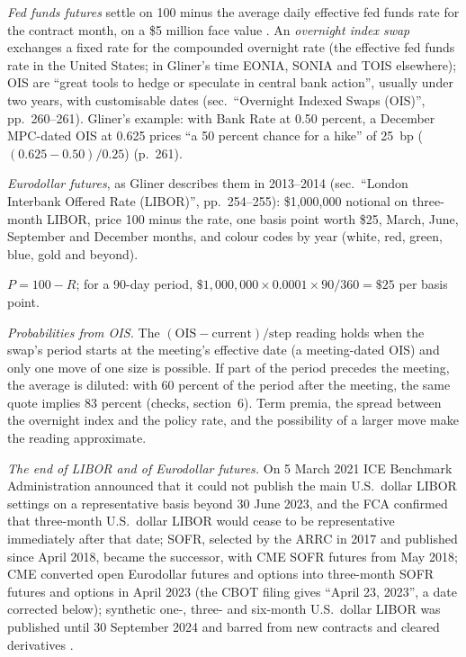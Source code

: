\begin{qfmethod}\label{meth:policy-path-ois-futures}
 \emph{Fed funds futures} settle on 100 minus the average daily effective fed funds rate for the contract month, on a \$5 million face value \citep[chap.~9, sec.\ ``Federal (Fed) Funds'', PDF pp.~257--259, Table~9.1]{s7-gliner}. An \emph{overnight index swap} exchanges a fixed rate for the compounded overnight rate (the effective fed funds rate in the United States; in Gliner's time EONIA, SONIA and TOIS elsewhere); OIS are ``great tools to hedge or speculate in central bank action'', usually under two years, with customisable dates (sec.\ ``Overnight Indexed Swaps (OIS)'', pp.~260--261). Gliner's example: with Bank Rate at 0.50 percent, a December MPC-dated OIS at 0.625 prices ``a 50 percent chance for a hike'' of 25~bp ($(0.625-0.50)/0.25$) (p.~261).

\emph{Eurodollar futures}, as Gliner describes them in 2013--2014 (sec.\ ``London Interbank Offered Rate (LIBOR)'', pp.~254--255): \$1,000,000 notional on three-month LIBOR, price 100 minus the rate, one basis point worth \$25, March, June, September and December months, and colour codes by year (white, red, green, blue, gold and beyond).

 $P=100-R$; for a 90-day period, $\$1{,}000{,}000\times0.0001\times90/360=\$25$ per basis point.

 \emph{Probabilities from OIS.} The $(\text{OIS}-\text{current})/\text{step}$ reading holds when the swap's period starts at the meeting's effective date (a meeting-dated OIS) and only one move of one size is possible. If part of the period precedes the meeting, the average is diluted: with 60 percent of the period after the meeting, the same quote implies 83 percent (checks, section~6). Term premia, the spread between the overnight index and the policy rate, and the possibility of a larger move make the reading approximate.

 \emph{The end of LIBOR and of Eurodollar futures.} On 5 March 2021 ICE Benchmark Administration announced that it could not publish the main U.S.\ dollar LIBOR settings on a representative basis beyond 30 June 2023, and the FCA confirmed that three-month U.S.\ dollar LIBOR would cease to be representative immediately after that date; SOFR, selected by the ARRC in 2017 and published since April 2018, became the successor, with CME SOFR futures from May 2018; CME converted open Eurodollar futures and options into three-month SOFR futures and options in April 2023 (the CBOT filing gives ``April 23, 2023'', a date corrected below); synthetic one-, three- and six-month U.S.\ dollar LIBOR was published until 30 September 2024 and barred from new contracts and cleared derivatives \citep[secs.~1--2, pp.~1--5]{cbot-23-214}.


\end{qfmethod}

